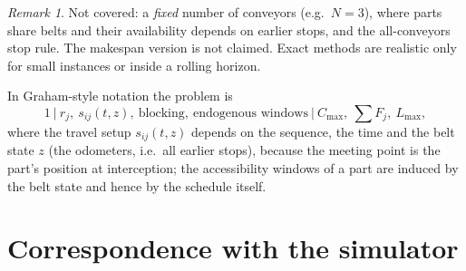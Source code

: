 \documentclass[11pt,a4paper]{article}
\theoremstyle{definition}
\theoremstyle{remark}
\newtheorem{remark}{Remark}
\begin{document}
\begin{remark}
Not covered: a \emph{fixed} number of conveyors (e.g.\ $N=3$), where parts share belts
and their availability depends on earlier stops, and the all-conveyors stop rule. The
makespan version is not claimed. Exact methods are realistic only for small instances
or inside a rolling horizon.
\end{remark}

In Graham-style notation the problem is
\[
1\ \big|\ r_j,\ s_{ij}(t,z),\ \text{blocking},\ \text{endogenous windows}\ \big|\ C_{\max},\ \textstyle\sum F_j,\ L_{\max},
\]
where the travel setup $s_{ij}(t,z)$ depends on the sequence, the time and the belt
state $z$ (the odometers, i.e.\ all earlier stops), because the meeting point is the
part's position at interception; the accessibility windows of a part are induced by
the belt state and hence by the schedule itself.

\section{Correspondence with the simulator}
\end{document}
